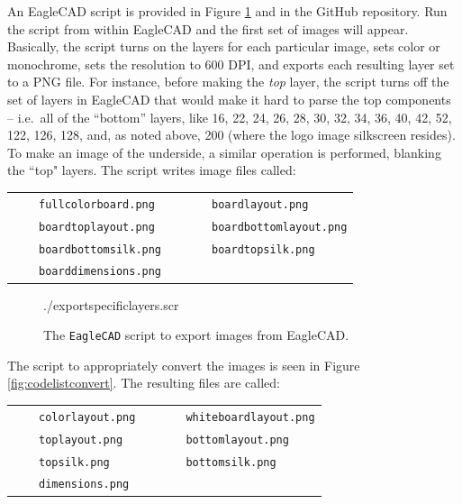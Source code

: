 \documentclass[12pt]{article}
\newcommand{\+}{\item}		%
\newcommand{\sep}{1mm}
\newcommand{\tabitem}{~~\llap{\textbullet}~~}
\newcommand{\colorimagename}{colorlayout.png}
\newcommand{\twolayermonochrome}{whiteboardlayout.png}
\newcommand{\topmonochrome}{toplayout.png}
\newcommand{\bottommonochrome}{bottomlayout.png}
\newcommand{\bottomsilk}{bottomsilk.png}
\newcommand{\topsilk}{topsilk.png}
\newcommand{\boarddimensions}{dimensions.png}
\begin{document}
An EagleCAD script is provided in Figure \ref{fig:codelistexport} and in the GitHub repository. Run the script from within EagleCAD and the first set of images will appear. Basically, the script turns on the layers for each particular image, sets color or monochrome, sets the resolution to 600 DPI, and exports each resulting layer set to a PNG file. For instance, before making the \emph{top} layer, the script turns off the set of layers in EagleCAD that would make it hard to parse the top components -- i.e.~all of the ``bottom'' layers, like 16, 22, 24, 26, 28, 30, 32, 34, 36, 40, 42, 52, 122, 126, 128, and, as noted above, 200 (where the logo image silkscreen resides). To make an image of the underside, a similar operation is performed, blanking the ``top" layers. The script writes image files called:

\bigskip

\begin{tabular}{lll}
\tabitem \texttt{fullcolorboard.png} && \tabitem \texttt{boardlayout.png} \\[\sep]
\tabitem \texttt{boardtoplayout.png} && \tabitem \texttt{boardbottomlayout.png} \\[\sep]
\tabitem \texttt{boardbottomsilk.png} && \tabitem \texttt{boardtopsilk.png} \\[\sep]
\tabitem \texttt{boarddimensions.png} \\[\sep]
\end{tabular}

\begin{figure}
\vspace{-0.5in}

 {./exportspecificlayers.scr}

\caption{The \texttt{EagleCAD} script to export images from EagleCAD.}
\label{fig:codelistexport}
\end{figure}


The script to appropriately convert the images is seen in Figure \ref{fig:codelistconvert}. The resulting files are called: 

\medskip

\begin{tabular}{lll}
\tabitem \texttt{\colorimagename} && \tabitem \texttt{\twolayermonochrome} \\[\sep]
\tabitem \texttt{\topmonochrome} && \tabitem \texttt{\bottommonochrome} \\[\sep]
\tabitem \texttt{\topsilk} && \tabitem \texttt{\bottomsilk} \\[\sep]
\tabitem \texttt{\boarddimensions} \\[\sep]
\end{tabular}
\medskip
\end{document}
